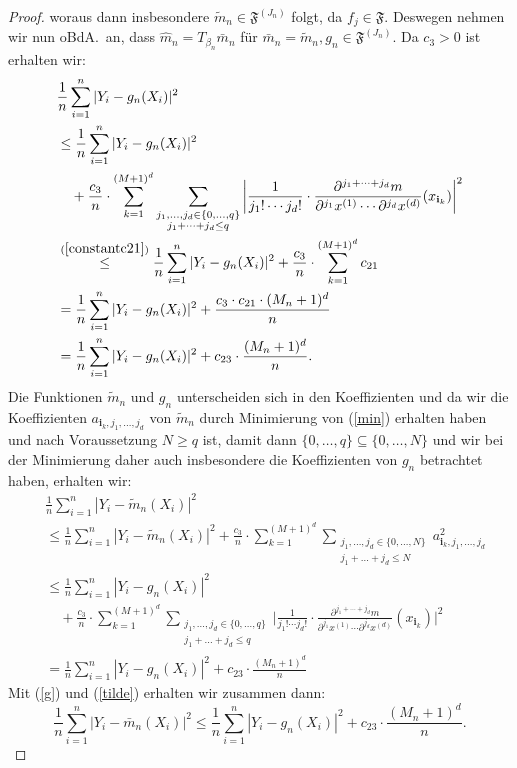 \begin{proof}
woraus dann insbesondere $\tilde{m}_n \in \mathfrak{F}^{(J_n)}$ folgt, da $f_j \in \mathfrak{F}$.
Deswegen nehmen wir nun oBdA.\ an, dass $\hat{m}_n = T_{\beta_n}\bar{m}_n$ für $\bar{m}_n = \tilde{m}_n, g_n \in \mathfrak{F}^{(J_n)}.$
Da $c_3 > 0$ ist erhalten wir$\colon$
\begin{equation}
\begin{split}
\label{g}
& \frac{1}{n} \sum_{i = 1}^n|Y_i - g_n(X_i)|^2 \\
& \leq \frac{1}{n} \sum_{i = 1}^n|Y_i - g_n(X_i)|^2 \\
& \quad + \frac{c_3}{n} \cdot \sum_{k = 1}^{(M + 1)^d} \sum_{\substack{ j_1,\dots,j_d \in \{0,\dots,q\} \\j_1+\dots +j_d \leq q}} \bigg|\frac{1}{j_1! \cdots j_d!} \cdot \frac{\partial^{j_1+\cdots + j_d} m}{\partial^{j_1} x^{(1)}\cdots \partial^{j_d} x^{(d)}}(x_{\mathbf{i}_k})\bigg|^2 \\
& \stackrel{(\ref{constantc21})}{\leq} \frac{1}{n} \sum_{i = 1}^n|Y_i - g_n(X_i)|^2 +  \frac{c_3}{n} \cdot \sum_{k = 1}^{(M + 1)^d} c_{21} \\
& = \frac{1}{n} \sum_{i = 1}^n|Y_i - g_n(X_i)|^2 + \frac{c_3 \cdot c_{21} \cdot (M_n + 1)^d}{n} \\
& = \frac{1}{n} \sum_{i = 1}^n|Y_i - g_n(X_i)|^2 + c_{23} \cdot \frac{(M_n + 1)^d}{n}.
\end{split}
\end{equation}
Die Funktionen $\tilde{m}_n$ und $g_n$ unterscheiden sich in den Koeffizienten und da wir die Koeffizienten $a_{\mathbf{i}_k,j_1,\dots,j_d}$ von $\tilde{m}_n$ durch Minimierung von (\ref{min}) erhalten haben und nach Voraussetzung $N \geq q$ ist, damit dann $\{0,\dots,q\} \subseteq \{0,\dots,N\}$ und wir bei der Minimierung daher auch insbesondere die Koeffizienten von $g_n$ betrachtet haben, erhalten wir$\colon$
\begin{equation}
\begin{split}
\label{tilde}
& \frac{1}{n} \sum_{i = 1}^n|Y_i - \tilde{m}_n(X_i)|^2 \\
& \leq \frac{1}{n} \sum_{i = 1}^n|Y_i - \tilde{m}_n(X_i)|^2 + \frac{c_3}{n} \cdot \sum_{k = 1}^{(M + 1)^d} \sum_{\substack{ j_1,\dots,j_d \in \{0,\dots,N\} \\j_1+\dots +j_d \leq N}} a_{\mathbf{i}_k,j_1,\dots,j_d}^2 \\
& \leq \frac{1}{n} \sum_{i = 1}^n|Y_i - g_n(X_i)|^2 \\
& \quad + \frac{c_3}{n} \cdot \sum_{k = 1}^{(M + 1)^d} \sum_{\substack{ j_1,\dots,j_d \in \{0,\dots,q\} \\j_1+\dots +j_d \leq q}} \bigg|\frac{1}{j_1! \cdots j_d!} \cdot \frac{\partial^{j_1+\cdots + j_d} m}{\partial^{j_1} x^{(1)}\cdots \partial^{j_d} x^{(d)}}(x_{\mathbf{i}_k})\bigg|^2 \\
& = \frac{1}{n} \sum_{i = 1}^n|Y_i - g_n(X_i)|^2 + c_{23} \cdot \frac{(M_n + 1)^d}{n}
\end{split}
\end{equation}
Mit (\ref{g}) und (\ref{tilde}) erhalten wir zusammen dann$\colon$
$$\frac{1}{n} \sum_{i = 1}^n|Y_i - \bar{m}_n(X_i)|^2 \leq \frac{1}{n} \sum_{i = 1}^n|Y_i - g_n(X_i)|^2 + c_{23} \cdot \frac{(M_n + 1)^d}{n}.$$
\end{proof}
